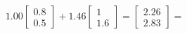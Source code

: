 \documentclass[preview]{standalone}
\begin{document}
\begin{align*}
1.00 \begin{bmatrix} 0.8 \\ 0.5 \end{bmatrix} + 1.46 \begin{bmatrix} 1 \\ 1.6 \end{bmatrix} = \begin{bmatrix} 2.26 \\ 2.83 \end{bmatrix} =
\end{align*}
\end{document}

